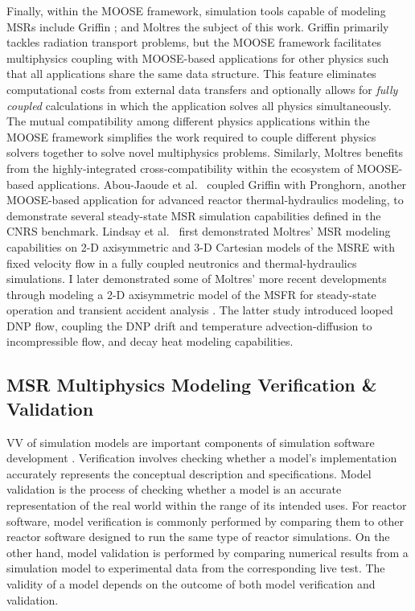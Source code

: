 Finally, within the \gls{MOOSE} framework, simulation tools capable of modeling
\glspl{MSR} include Griffin \cite{abou-jaoude_coupled_2020}; and Moltres
\cite{lindsay_moltres_2017}\textemdash the subject of this work.
Griffin primarily tackles radiation transport problems, but the \gls{MOOSE}
framework facilitates multiphysics coupling with \gls{MOOSE}-based applications for other physics
such that all applications share the same data structure. This feature eliminates
computational costs from external data transfers and optionally allows for
\textit{fully coupled} calculations in which the application solves all physics
simultaneously. The mutual compatibility among different physics applications within the
\gls{MOOSE} framework simplifies the work required to couple
different physics solvers together to solve novel multiphysics problems. Similarly,
Moltres benefits from the highly-integrated cross-compatibility
within the ecosystem of \gls{MOOSE}-based applications. Abou-Jaoude et al.\
\cite{abou-jaoude_coupled_2020} coupled Griffin with Pronghorn, another
\gls{MOOSE}-based application for advanced reactor thermal-hydraulics modeling, to
demonstrate several steady-state \gls{MSR} simulation capabilities defined in
the CNRS benchmark. Lindsay et al.\
\cite{lindsay_introduction_2018} first demonstrated Moltres' \gls{MSR} modeling
capabilities on 2-D axisymmetric and 3-D Cartesian models of the \gls{MSRE} with
fixed velocity flow in a fully coupled neutronics and thermal-hydraulics simulations.
I later demonstrated some of Moltres' more recent developments through
modeling a 2-D axisymmetric model of the \gls{MSFR} for steady-state operation
and transient accident analysis \cite{park_advancement_2020}. The latter study
introduced looped \gls{DNP} flow, coupling the \gls{DNP} drift and temperature 
advection-diffusion to incompressible flow, and decay heat modeling
capabilities.

\subsection{MSR Multiphysics Modeling Verification \& Validation} \label{sec:msr-vv}

\Gls{VV} of simulation models are important components of simulation software development
\cite{sargent_verification_2010}. Verification involves checking whether a model's implementation
accurately represents the conceptual description and specifications. Model
validation is the process of checking whether a model is an accurate representation of the real
world within the range of its intended uses. For reactor software, model verification is commonly
performed by comparing them to other reactor software designed to run the same type of reactor
simulations. On the other hand, model validation is performed by comparing numerical results from
a simulation model to experimental data from the corresponding live test. The validity of a model
depends on the outcome of both model verification and validation.


